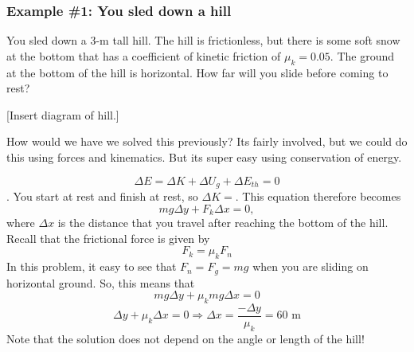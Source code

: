 \subsubsection{Example \#1: You sled down a hill}
You sled down a 3-m tall hill. The hill is frictionless, but there is some soft snow at the bottom that has a coefficient of kinetic friction of $\mu_k=0.05$. The ground at the bottom of the hill is horizontal. How far will you slide before coming to rest?

[Insert diagram of hill.]
\vspace{5cm}

How would we have we solved this previously? Its fairly involved, but we could do this using forces and kinematics. But its super easy using conservation of energy.

$$\Delta{E}=\Delta{K}+\Delta{U_g}+\Delta{E_{th}}=0$$.
You start at rest and finish at rest, so $\Delta{K}=$. This equation therefore becomes
$$mg\Delta{y}+F_k\Delta{x}=0,$$
where $\Delta{x}$ is the distance that you travel after reaching the bottom of the hill. Recall that the frictional force is given by
$$F_k=\mu_kF_n$$
In this problem, it easy to see that $F_n=F_g=mg$ when you are sliding on horizontal ground. So, this means that
$$mg\Delta{y}+\mu_k mg\Delta{x}=0$$
$$\Delta{y}+\mu_k \Delta{x}=0\Rightarrow \boxed{\Delta{x}=\frac{-\Delta{y}}{\mu_k}=60\mbox{ m}}$$
Note that the solution does not depend on the angle or length of the hill!


\clearpage
